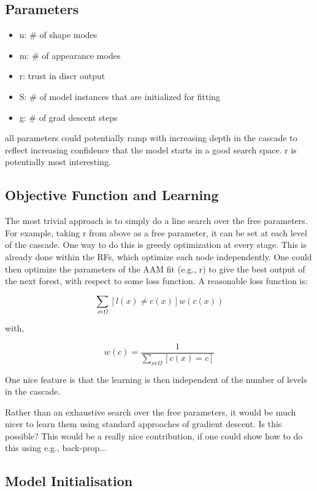 \documentclass[10pt,twocolumn,letterpaper]{article}
\begin{document}
\subsection{Parameters}

\begin{itemize}
\item n: \# of shape modes
\item m: \# of appearance modes
\item r: trust in discr output
\item S: \# of model instances that are initialized for fitting
\item g: \# of grad descent steps
\end{itemize}

all parameters could potentially ramp with increasing depth in the cascade to reflect increasing confidence that the model starts in a good search space.  r is potentially most interesting.

\subsection{Objective Function and Learning}

The most trivial approach is to simply do a line search over the free parameters. For example, taking r from above as a free parameter, it can be set at each level of the cascade. One way to do this is greedy optimization at every stage.  This is already done within the RFs, which optimize each node independently.  One could then optimize the parameters of the AAM fit (e.g., r) to give the best output of the next forest, with respect to some loss function.  A reasonable loss function is:

\[ \sum_{x \epsilon \Omega} [l(x) \neq c(x)] w(c(x)) \]

with,

\[ w(c) = \frac{1}{\sum_{x \epsilon \Omega} [c(x) = c]} \]

One nice feature is that the learning is then independent of the number of levels in the cascade.

Rather than an exhaustive search over the free parameters, it would be much nicer to learn them using standard approaches of gradient descent.  Is this possible?  This would be a really nice contribution, if one could show how to do this using e.g., back-prop...

\subsection{Model Initialisation}
\end{document}

